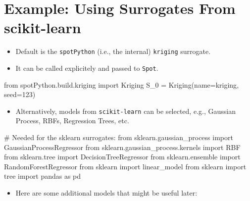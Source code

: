 \documentclass[
  letterpaper,
  DIV=11,
  numbers=noendperiod]{scrreprt}
\newenvironment{Shaded}{\begin{snugshade}}{\end{snugshade}}
\newcommand{\CommentTok}[1]{\textcolor[rgb]{0.37,0.37,0.37}{#1}}
\newcommand{\DecValTok}[1]{\textcolor[rgb]{0.68,0.00,0.00}{#1}}
\newcommand{\ImportTok}[1]{\textcolor[rgb]{0.00,0.46,0.62}{#1}}
\newcommand{\NormalTok}[1]{\textcolor[rgb]{0.00,0.23,0.31}{#1}}
\newcommand{\OperatorTok}[1]{\textcolor[rgb]{0.37,0.37,0.37}{#1}}
\newcommand{\StringTok}[1]{\textcolor[rgb]{0.13,0.47,0.30}{#1}}
\providecommand{\tightlist}{%
  \setlength{\itemsep}{0pt}\setlength{\parskip}{0pt}}\usepackage{longtable,booktabs,array}
\begin{document}
\hypertarget{example-using-surrogates-from-scikit-learn}{%
\section{Example: Using Surrogates From
scikit-learn}\label{example-using-surrogates-from-scikit-learn}}

\begin{itemize}
\tightlist
\item
  Default is the \texttt{spotPython} (i.e., the internal)
  \texttt{kriging} surrogate.
\item
  It can be called explicitely and passed to \texttt{Spot}.
\end{itemize}

\begin{Shaded}
\begin{Highlighting}[]
\ImportTok{from}\NormalTok{ spotPython.build.kriging }\ImportTok{import}\NormalTok{ Kriging}
\NormalTok{S\_0 }\OperatorTok{=}\NormalTok{ Kriging(name}\OperatorTok{=}\StringTok{\textquotesingle{}kriging\textquotesingle{}}\NormalTok{, seed}\OperatorTok{=}\DecValTok{123}\NormalTok{)}
\end{Highlighting}
\end{Shaded}

\begin{itemize}
\tightlist
\item
  Alternatively, models from \texttt{scikit-learn} can be selected,
  e.g., Gaussian Process, RBFs, Regression Trees, etc.
\end{itemize}

\begin{Shaded}
\begin{Highlighting}[]
\CommentTok{\# Needed for the sklearn surrogates:}
\ImportTok{from}\NormalTok{ sklearn.gaussian\_process }\ImportTok{import}\NormalTok{ GaussianProcessRegressor}
\ImportTok{from}\NormalTok{ sklearn.gaussian\_process.kernels }\ImportTok{import}\NormalTok{ RBF}
\ImportTok{from}\NormalTok{ sklearn.tree }\ImportTok{import}\NormalTok{ DecisionTreeRegressor}
\ImportTok{from}\NormalTok{ sklearn.ensemble }\ImportTok{import}\NormalTok{ RandomForestRegressor}
\ImportTok{from}\NormalTok{ sklearn }\ImportTok{import}\NormalTok{ linear\_model}
\ImportTok{from}\NormalTok{ sklearn }\ImportTok{import}\NormalTok{ tree}
\ImportTok{import}\NormalTok{ pandas }\ImportTok{as}\NormalTok{ pd}
\end{Highlighting}
\end{Shaded}

\begin{itemize}
\tightlist
\item
  Here are some additional models that might be useful later:
\end{itemize}
\end{document}
